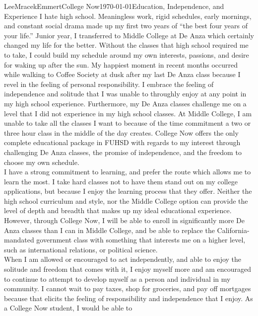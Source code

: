 \documentclass[a4paper]{article}
\begin{document}
\begin{mla}{Lee}{Mracek}{Emmert}{College Now}{\today}{Education, Independence,
    and Experience}
    I hate high school. Meaningless work, rigid schedules, early mornings, and
    constant social drama made up my first two years of ``the best four years of
    your life.'' Junior year, I transferred to Middle College at De Anza which
    certainly changed my life for the better. Without the classes that high
    school required me to take, I could build my schedule around my own
    interests, passions, and desire for waking up after the sun. My happiest
    moment in recent months occurred while walking to Coffee Society at dusk
    after my last De Anza class because I revel in the feeling of personal
    responsibility. I embrace the feeling of independence and
    solitude that I was unable to throughly enjoy at any point in my high school experience. Furthermore, my De Anza classes challenge me on a level that I did not experience in my high school classes. At Middle College, I am unable to take all the classes I want to because of the time commitment a two or three hour class in the middle of the day creates. College Now offers the only complete educational package in FUHSD with regards to my interest through challenging De Anza classes, the promise of independence, and the freedom to choose my own schedule. \\
    I have a strong commitment to learning, and prefer the route which allows me
    to learn the most. I take hard classes not to have them stand out on my
    college applications, but because I enjoy the learning process that they
    offer. Neither the high school curriculum and style, nor the Middle College
    option can provide the level of depth and breadth that makes up my ideal educational experience. However, through College Now, I will be able to enroll in significantly more De Anza classes than I can in Middle College, and be able to replace the California-mandated government class with something that interests me on a higher level, such as international relations, or political science. \\
    When I am allowed or encouraged to act independently, and able to enjoy the
    solitude and freedom that comes with it, I enjoy myself more and am
    encouraged to continue to attempt to develop myself as a person and
    individual in my community. I cannot wait to pay taxes, shop for groceries,
    and pay off mortgages because that elicits the feeling of responsibility and
    independence that I enjoy. As a College Now student, I would be able to

\end{mla}
\end{document}
